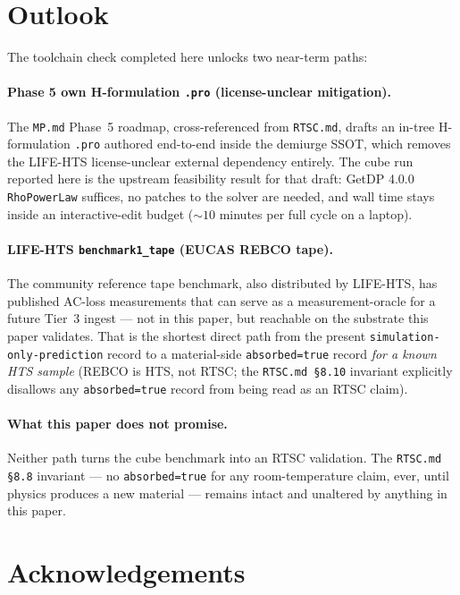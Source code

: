 \documentclass[11pt,a4paper]{article}
\newcommand{\absorbedtrue}{\textcolor{honestgreen}{\texttt{absorbed=true}}}
\newcommand{\simonly}{\texttt{simulation-only-prediction}}
\begin{document}
\section{Outlook}
\label{sec:outlook}

The toolchain check completed here unlocks two near-term paths:

\paragraph{Phase 5 own H-formulation \texttt{.pro} (license-unclear
mitigation).} The \texttt{MP.md} Phase~5 roadmap, cross-referenced
from \texttt{RTSC.md}, drafts an in-tree H-formulation \texttt{.pro}
authored end-to-end inside the demiurge SSOT, which removes the
LIFE-HTS license-unclear external dependency entirely. The cube
run reported here is the upstream feasibility result for that
draft: GetDP 4.0.0 \texttt{RhoPowerLaw} suffices, no patches to the
solver are needed, and wall time stays inside an interactive-edit
budget ($\sim 10$ minutes per full cycle on a laptop).

\paragraph{LIFE-HTS \texttt{benchmark1\_tape} (EUCAS REBCO tape).}
The community reference tape benchmark, also distributed by
LIFE-HTS, has published AC-loss measurements that can serve as a
measurement-oracle for a future Tier~3 ingest --- not in this paper,
but reachable on the substrate this paper validates. That is the
shortest direct path from the present \simonly{} record to a
material-side \absorbedtrue{} record \emph{for a known HTS sample}
(REBCO is HTS, not RTSC; the \texttt{RTSC.md \S8.10} invariant
explicitly disallows any \absorbedtrue{} record from being read as
an RTSC claim).

\paragraph{What this paper does not promise.} Neither path turns
the cube benchmark into an RTSC validation. The
\texttt{RTSC.md \S8.8} invariant --- no \absorbedtrue{} for any
room-temperature claim, ever, until physics produces a new
material --- remains intact and unaltered by anything in this
paper.

\section*{Acknowledgements}
\end{document}
